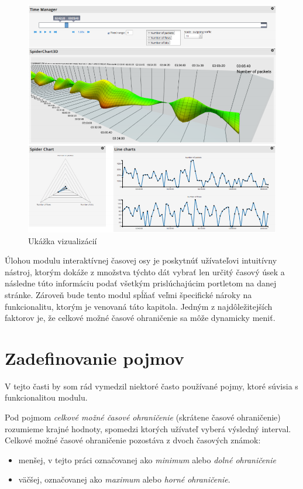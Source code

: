 \documentclass[
  digital, %
  twoside, %
  notable,   %
  nolof,   %
  nolot,   %
]{fithesis3}
\begin{document}
\begin{figure}[H]
	\center
	\includegraphics[width=1.0\linewidth]{visualization}
	\caption{Ukážka vizualizácií\cite{eichler2014analytical}}
	\label{visualization}
\end{figure}

Úlohou modulu interaktívnej časovej osy je poskytnúť užívateľovi intuitívny nástroj, ktorým dokáže z množstva týchto dát vybrať len určitý časový úsek a následne túto informáciu podať všetkým prislúchajúcim portletom na danej stránke. Zároveň bude tento modul spĺňať veľmi špecifické nároky na funkcionalitu, ktorým je venovaná táto kapitola. Jedným z najdôležitejších faktorov je, že celkové možné časové ohraničenie sa môže dynamicky meniť.

\section{Zadefinovanie pojmov}
V tejto časti by som rád vymedzil niektoré často používané pojmy, ktoré súvisia s funkcionalitou modulu.

Pod pojmom \textit{celkové možné časové ohraničenie} (skrátene časové ohraničenie) rozumieme krajné hodnoty, spomedzi ktorých užívateľ vyberá výsledný interval. Celkové možné časové ohraničenie pozostáva z dvoch časových známok:
\begin{itemize}
\item menšej, v tejto práci označovanej ako \textit{minimum} alebo \textit{dolné ohraničenie}
\item väčšej, označovanej ako \textit{maximum} alebo \textit{horné ohraničenie}.
\end{itemize}
\end{document}
